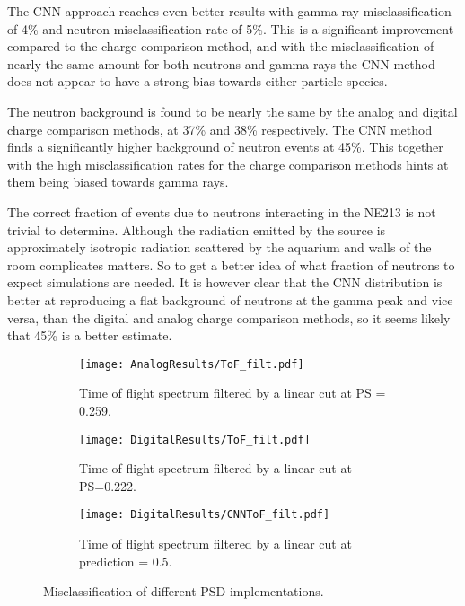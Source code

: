 \documentclass[main.tex]{subfiles}
\begin{document}
The CNN approach reaches even better results with gamma ray misclassification of 4\% and neutron misclassification rate of 5\%.
This is a significant improvement compared to the charge comparison method, and with the misclassification of nearly the same amount for both neutrons and gamma rays the CNN method does not appear to have a strong bias towards either particle species.

The neutron background is found to be nearly the same by the analog and digital charge comparison methods, at 37\% and 38\% respectively. The CNN method finds a significantly higher background of neutron events at 45\%. This together with the high misclassification rates for the charge comparison methods hints at them being biased towards gamma rays.

The correct fraction of events due to neutrons interacting in the NE213 is not trivial to determine. Although the radiation emitted by the source is approximately isotropic radiation scattered by the aquarium and walls of the room complicates matters. So to get a better idea of what fraction of neutrons to expect simulations are needed. It is however clear that the CNN distribution is better at reproducing a flat background of neutrons at the gamma peak and vice versa, than the digital and analog charge comparison methods, so it seems likely that 45\% is a better estimate.



\begin{figure}
    \centering
    \begin{subfigure}[bh]{\textwidth}
   	   	\centering
	    \texttt{[image: AnalogResults/ToF\_filt.pdf]}
    	\caption{Time of flight spectrum filtered by a linear cut at PS = 0.259.}
    	\label{fig:ToF_filt_A}
   	\end{subfigure}
    \begin{subfigure}[bh]{\textwidth}
   	    \centering
        \texttt{[image: DigitalResults/ToF\_filt.pdf]}
        \caption{Time of flight spectrum filtered by a linear cut at PS=0.222.}
        \label{fig:ToF_filt_D}
    \end{subfigure}
	\begin{subfigure}[bh]{\textwidth}
	    \centering
        \texttt{[image: DigitalResults/CNNToF\_filt.pdf]}
        \caption{Time of flight spectrum filtered by a linear cut at prediction = 0.5.}
        \label{fig:ToF_filt_D_CNN}
    \end{subfigure}
	\caption[Misclassification of different PSD implementations.]{Misclassification of different PSD implementations.}
    \label{fig:tof_cc_cnn}
\end{figure}
\end{document}
